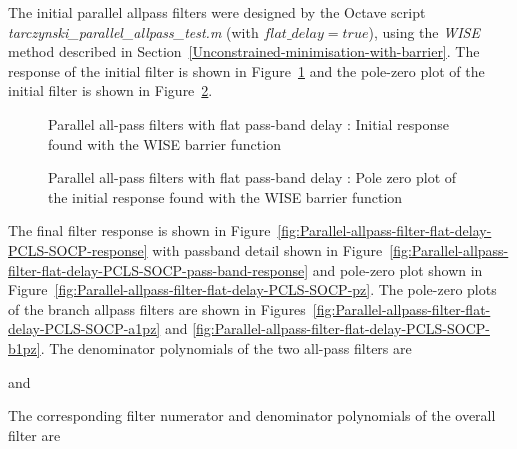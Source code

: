 \documentclass[a4paper,twoside,10pt,english]{report}
\begin{document}
The initial parallel allpass filters were designed by the Octave script 
\emph{tarczynski\_parallel\_allpass\_test.m} (with $flat\_delay=true$), 
using the \emph{WISE} method described in 
Section~\ref{Unconstrained-minimisation-with-barrier}. The response
of the initial filter is shown in
Figure~\ref{fig:Parallel-allpass-filter-flat-delay-initial-response} and the 
pole-zero plot of the initial filter is shown in
Figure~\ref{fig:Parallel-allpass-filter-flat-delay-initial-response-pz}.
\begin{figure}[!htbp]
\begin{center}
\scalebox{0.7}{}
\caption{Parallel all-pass filters with flat pass-band delay : Initial response found with the WISE barrier function}
\label{fig:Parallel-allpass-filter-flat-delay-initial-response}
\end{center}
\end{figure}
\begin{figure}[!htbp]
\begin{center}
\scalebox{0.7}{}
\caption{Parallel all-pass filters with flat pass-band delay : Pole zero plot of the initial response found with the WISE barrier function}
\label{fig:Parallel-allpass-filter-flat-delay-initial-response-pz}
\end{center}
\end{figure}
The final filter response is shown in
Figure~\ref{fig:Parallel-allpass-filter-flat-delay-PCLS-SOCP-response} with 
passband detail shown in 
Figure~\ref{fig:Parallel-allpass-filter-flat-delay-PCLS-SOCP-pass-band-response}
and pole-zero plot shown in 
Figure~\ref{fig:Parallel-allpass-filter-flat-delay-PCLS-SOCP-pz}. The pole-zero
plots of the branch allpass filters are shown in 
Figures~\ref{fig:Parallel-allpass-filter-flat-delay-PCLS-SOCP-a1pz} and 
\ref{fig:Parallel-allpass-filter-flat-delay-PCLS-SOCP-b1pz}. 
The denominator polynomials of the two all-pass filters are
\begin{small}

\end{small}
and
\begin{small}

\end{small}
The corresponding filter numerator and denominator polynomials of the overall
filter are
\begin{small}

\end{small}
\end{document}
